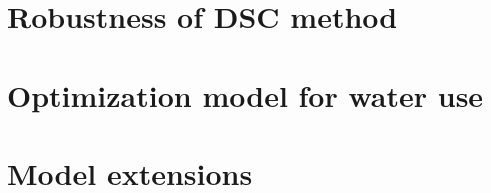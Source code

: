 \documentclass[preprint, 12pt]{elsarticle}
\begin{document}
\section{Robustness of DSC method}\label{secS2}
\renewcommand{\thefigure}{B\arabic{figure}}
\renewcommand{\thetable}{B\arabic{table}}
\setcounter{figure}{0}
\setcounter{table}{0}


% 

\section{Optimization model for water use}\label{secS4}
\renewcommand{\thefigure}{C\arabic{figure}}
\renewcommand{\thetable}{C\arabic{table}}
\setcounter{figure}{0}
\setcounter{table}{0}


\section{Model extensions}\label{secS5}
\renewcommand{\thefigure}{D\arabic{figure}}
\renewcommand{\thetable}{D\arabic{table}}
\setcounter{figure}{0}
\setcounter{table}{0}

\end{document}
